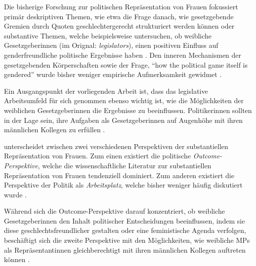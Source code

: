 \documentclass[12pt, 
    twoside=false, 
    bibliography=totoc, 
    numbers=endperiod, 
    headings=normal, 
    toc=chapterentrydotfill
    ]{scrbook}
\begin{document}

Die bisherige Forschung zur politischen Repräsentation von Frauen fokussiert primär deskriptiven Themen, wie etwa die Frage danach, wie gesetzgebende Gremien durch Quoten geschlechtergerecht strukturiert werden können \parencites [vgl.]{dahlerup_2005}{schwindt-bayer_2009} oder substantive Themen, welche beispielsweise untersuchen, ob weibliche Gesetzgeberinnen (im Orignal: \emph{legislators}), einen positiven Einfluss auf genderfreundliche politische Ergebnisse haben \parencites [199]{erikson_2018}{beckwith_2007}. Den inneren Mechanismen der gesetzgebenden Körperschaften sowie der Frage, \enquote{how the political game itself is gendered} wurde bisher weniger empirische Aufmerksamkeit gewidmet \parencites[199]{erikson_2018}[vgl.][]{childs_2016}{dahlerup_2013}{wangnerud_2015}.

Ein Ausgangspunkt der vorliegenden Arbeit ist, dass das legislative Arbeitsumfeld für sich genommen ebenso wichtig ist, wie die Möglichkeiten der weiblichen Gesetzgeberinnen die Ergebnisse zu beeinflussen. Politikerinnen sollten in der Lage sein, ihre Aufgaben als Gesetzgeberinnen auf Augenhöhe mit ihren männlichen Kollegen zu erfüllen \parencite[199]{erikson_2018}. 

\textcites{dahlerup_2006}{dahlerup_1988} unterscheidet zwischen zwei verschiedenen Perspektiven der substantiellen Repräsentation von Frauen. Zum einen existiert die politische \emph{Outcome-Perspektive}, welche die wissenschaftliche Literatur zur substantiellen Repräsentation von Frauen tendenziell dominiert. Zum anderen existiert die Perspektive der Politik als \emph{Arbeitsplatz}, welche bisher weniger häufig diskutiert wurde \parencites[513]{dahlerup_2006}[199]{erikson_2018}. 

Während sich die Outcome-Perspektive darauf konzentriert, ob weibliche Gesetzgeberinnen den Inhalt politischer Entscheidungen beeinflussen, indem sie diese geschlechtsfreundlicher gestalten oder eine feministische Agenda verfolgen, beschäftigt sich die zweite Perspektive mit den Möglichkeiten, wie weibliche MPs als Repräsentantinnen gleichberechtigt mit ihren männlichen Kollegen auftreten können \parencites[199]{erikson_2018}{dahlerup_2006}{dahlerup_1988}.
\end{document}
